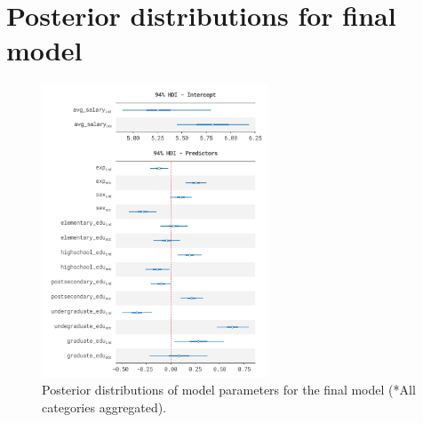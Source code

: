 \chapter{Posterior distributions for final model}\label{app:posterior_dists_final}

\begin{figure}[H]
    \centering
    \includegraphics[width=0.6\textwidth]{images/appendix/final.png}
    \caption{Posterior distributions of model parameters for the final model (*All categories aggregated).}
    \label{fig:posterior_dists_final}
\end{figure}